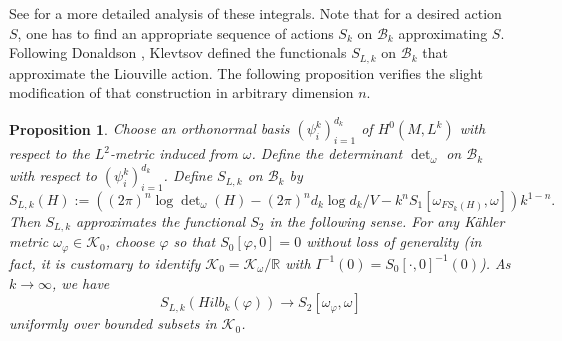 \documentclass[12pt,reqno,a4paper]{amsart}
\numberwithin{equation}{section}
\newtheorem{prop}[theo]{{\sc Proposition}}
\theoremstyle{remark}
\theoremstyle{dotless}
\begin{document}
See \cite{klevtsov2014stability} for a more detailed analysis of these integrals. Note that for a desired action $S$, one has to find an appropriate sequence of actions $S_k$ on $\mathcal{B}_k$ approximating $S$. Following Donaldson \cite{donaldson2005scalar}, Klevtsov \cite[(7.7)]{klevtsov2014random} defined the functionals $S_{L,k}$ on $\mathcal{B}_k$ that approximate the Liouville action. The following proposition verifies the slight modification of that construction in arbitrary dimension $n$.

\begin{prop}
Choose an orthonormal basis $(\psi_i^k)_{i=1}^{d_k}$ of $H^0(M,L^k)$ with respect to the $L^2$-metric induced from $\omega$. Define the determinant $\det\nolimits_\omega$ on $\mathcal{B}_k$ with respect to $(\psi_i^k)_{i=1}^{d_k}$. Define $S_{L,k}$ on $\mathcal{B}_k$ by
\begin{equation*}
S_{L,k}(H):=\left( (2\pi)^n\log \det\nolimits_{\omega} (H)-(2\pi)^n d_k\log d_k/V - k^nS_1[ \omega_{FS_k(H)},\omega] \right)k^{1-n}.
\end{equation*}
Then $S_{L,k}$ approximates the functional $S_2$ in the following sense.
For any K\"ahler metric $\omega_\varphi \in \mathcal{K}_0$, choose $\varphi$ so that $S_0[\varphi,0]=0$ without loss of generality (in fact, it is customary to identify $\mathcal{K}_0 = \mathcal{K}_\omega/\mathbb{R}$ with $I^{-1}(0)=S_0[\cdot,0]^{-1}(0)$). As $k\rightarrow\infty$, we have
\begin{equation*}
S_{L,k}(Hilb_k(\varphi)) \rightarrow S_2[\omega_\varphi,\omega]
\end{equation*}
uniformly over bounded subsets in $\mathcal{K}_0$.
\end{prop}
\end{document}

